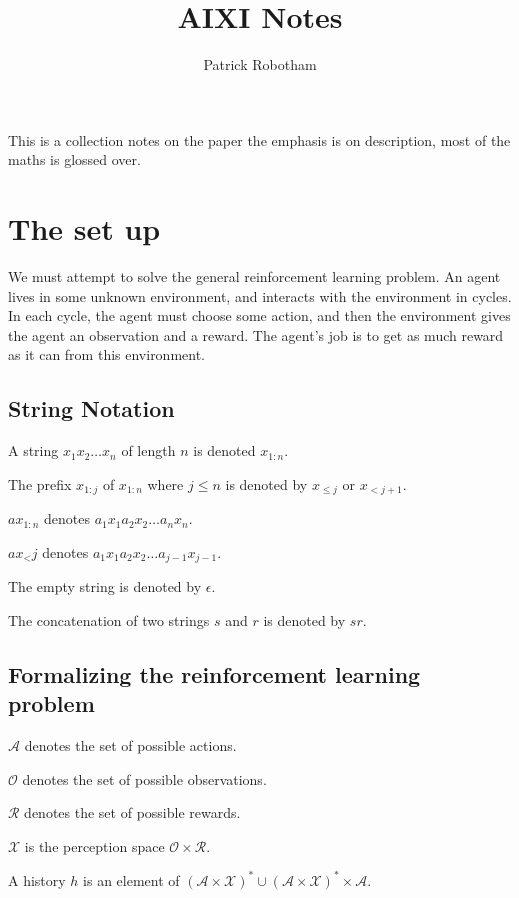 \documentclass[12pt,a4paper,twoside]{article}
\author{Patrick Robotham}
\title{AIXI Notes}
\theoremstyle{upright}
\begin{document}
\maketitle

This is a collection notes on the paper \cite{MC-AIXI} the emphasis is on description, most of the maths 
is glossed over.


\section{The set up}

We must attempt to solve the general reinforcement learning problem. 
An agent lives in some unknown environment, and interacts with the environment in cycles.
In each cycle, the agent must choose some action, and then the environment gives the agent 
an observation and a reward. The agent's job is to get as much reward as it can from this environment.

\subsection{String Notation}
A string $x_1 x_2 \ldots x_n$ of length $n$ is denoted $x_{1:n}$.

The prefix $x_{1:j}$ of $x_{1:n}$ where $j \leq n$ is denoted by $x_{\leq j}$ or $x_{< j+1}$.

$ax_{1:n}$ denotes $a_1 x_1 a_2 x_2 \ldots a_n x_n$.

$ax_<j$ denotes $a_1 x_1 a_2 x_2 \ldots a_{j-1} x_{j-1}$.

The empty string is denoted by $\epsilon$.

The concatenation of two strings $s$ and $r$ is denoted by $sr$.

\subsection{Formalizing the reinforcement learning problem}

$\mathscr{A}$ denotes the set of possible actions. 

$\mathscr{O}$ denotes the set of possible observations.

$\mathscr{R}$ denotes the set of possible rewards. 

$\mathscr{X}$ is the perception space $\mathscr{O} \times
\mathscr{R}$.

\dfn A history $h$ is an element of $(\mathscr{A} \times \mathscr{X})^* \cup 
(\mathscr{A} \times \mathscr{X})^* \times \mathscr{A}$.
\end{document}
